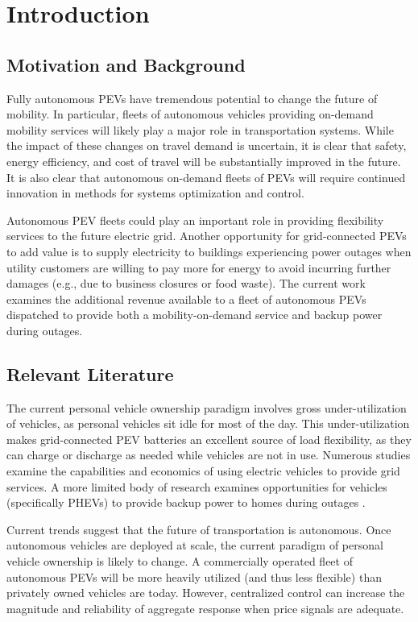 \documentclass[conference]{IEEEtran}
\begin{document}
\section{Introduction}
\subsection{Motivation and Background}
Fully autonomous PEVs have tremendous potential to change the future of mobility. In particular, fleets of autonomous vehicles providing on-demand mobility services will likely play a major role in transportation systems. While the impact of these changes on travel demand is uncertain, it is clear that safety, energy efficiency, and cost of travel will be substantially improved in the future. It is also clear that autonomous on-demand fleets of PEVs will require continued innovation in methods for systems optimization and control.

Autonomous PEV fleets could play an important role in providing flexibility services to the future electric grid. Another opportunity for grid-connected PEVs to add value is to supply electricity to buildings experiencing power outages when utility customers are willing to pay more for energy to avoid incurring further damages (e.g., due to business closures or food waste). The current work examines the additional revenue available to a fleet of autonomous PEVs dispatched to provide both a mobility-on-demand service and backup power during outages.

\subsection{Relevant Literature}
The current personal vehicle ownership paradigm involves gross under-utilization of vehicles, as personal vehicles sit idle for most of the day. This under-utilization makes grid-connected PEV batteries an excellent source of load flexibility, as they can charge or discharge as needed while vehicles are not in use. Numerous studies examine the capabilities \cite{lefloch_pde_2016, lefloch_pde_2015, ota_autonomous_v2g, behrouz_2014} and economics \cite{ota_autonomous_v2g} of using electric vehicles to provide grid services. A more limited body of research examines opportunities for vehicles (specifically PHEVs) to provide backup power to homes during outages \cite{shin2016}.

Current trends suggest that the future of transportation is autonomous. Once autonomous vehicles are deployed at scale, the current paradigm of personal vehicle ownership is likely to change. A commercially operated fleet of autonomous PEVs will be more heavily utilized (and thus less flexible) than privately owned vehicles are today. However, centralized control can increase the magnitude and reliability of aggregate response when price signals are adequate. 
\end{document}
